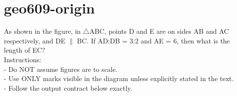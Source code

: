 \documentclass[12pt]{article}
\begin{document}
\section*{geo609-origin}
\noindent\begin{minipage}{\textwidth}
\setlength{\parskip}{4pt}
As shown in the figure, in \ensuremath{\triangle }ABC, points D and E are on sides AB and AC respectively, and DE \ensuremath{\parallel } BC. If AD:DB = 3:2 and AE = 6, then what is the length of EC?\\
Instructions:\\
- Do NOT assume figures are to scale.\\
- Use ONLY marks visible in the diagram unless explicitly stated in the text.\\
- Follow the output contract below exactly.\\
\end{minipage}
\end{document}
